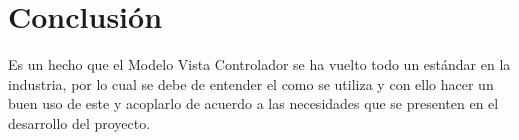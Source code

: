 \documentclass[a4paper,12pt]{article}
\begin{document}
\section{Conclusión}
Es un hecho que el Modelo Vista Controlador se ha vuelto todo un estándar en la 
industria, por lo cual se debe de entender el como se utiliza y con ello hacer 
un buen uso de este y acoplarlo de acuerdo a las necesidades que se presenten 
en el desarrollo del proyecto.



\end{document}
